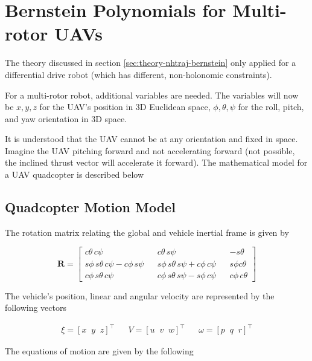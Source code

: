 \section{Bernstein Polynomials for Multi-rotor UAVs}

The theory discussed in section \ref{sec:theory-nhtraj-bernstein} only applied for a differential drive robot (which has different, non-holonomic constraints). 

For a multi-rotor robot, additional variables are needed. The variables will now be $x, y, z$ for the UAV's position in 3D Euclidean space, $\phi, \theta, \psi$ for the roll, pitch, and yaw orientation in 3D space.

It is understood that the UAV cannot be at any orientation and fixed in space. Imagine the UAV pitching forward and not accelerating forward (not possible, the inclined thrust vector will accelerate it forward). The mathematical model for a UAV quadcopter is described below

\subsection{Quadcopter Motion Model}

The rotation matrix relating the global and vehicle inertial frame is given by

\begin{equation*} 
    \mathbf{R} = \begin{bmatrix}
        c\theta\,c\psi && c\theta\,s\psi && -s\theta \\
        s\phi\,s\theta\,c\psi-c\phi\,s\psi && s\phi\,s\theta\,s\psi + c\phi\,c\psi && s\phi c\theta \\
        c\phi\,s\theta\,c\psi && c\phi\,s\theta\,s\psi-s\phi\,c\psi && c\phi\,c\theta
    \end{bmatrix}
\end{equation*}

The vehicle's position, linear and angular velocity are represented by the following vectors

\begin{align*}
    \xi = [x\;\;y\;\;z]^\top && V = [u\;\;v\;\;w]^\top && \omega = [p\;\;q\;\;r]^\top
\end{align*}

The equations of motion are given by the following

